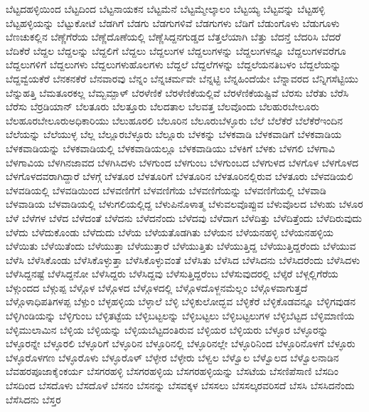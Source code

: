 {ಬೆಟ್ಟದಹಳ್ಳಿಯಿಂದ
ಬೆಟ್ಟದಿಂದ
ಬೆಟ್ಟನಾಯಕನ
ಬೆಟ್ಟಮೆನೆ
ಬೆಟ್ಟಮ್ಮೇಲ್ಕಾಲಂ
ಬೆಟ್ಟಯ್ಯ
ಬೆಟ್ಟವನ್ನು
ಬೆಟ್ಟಹಳ್ಳಿ
ಬೆಟ್ಟಹಳ್ಳಿಯನ್ನು
ಬೆಟ್ಟುಕೋಟೆ
ಬೆಡಗಿಗೆ
ಬೆಡಗು
ಬೆಡಗುಗಳಿವೆ
ಬೆಡಗುಗಳು
ಬೆಡಿಗೆ
ಬೆಡುಂಗೊಳು
ಬೆಡುಗೂಳು
ಬೆಣಚುಕಲ್ಲಿನ
ಬೆಣ್ಣೆಗೆರೆಯ
ಬೆಣ್ಣೆದೊಣೆಯಲ್ಲಿ
ಬೆಣ್ಣೆಸಿದ್ದನಗುಡ್ಡದ
ಬೆತ್ತಲೆಯಾಗಿ
ಬೆತ್ತು
ಬೆದನ್ತೆ
ಬೆದರಿಸಿ
ಬೆದರೆ
ಬೆದಿಕೆರೆ
ಬೆದ್ದಲ
ಬೆದ್ದಲನ್ನು
ಬೆದ್ದಲಿಗೆ
ಬೆದ್ದಲು
ಬೆದ್ದಲುಗಳ
ಬೆದ್ದಲುಗಳನ್ನು
ಬೆದ್ದಲುಗಳನ್ನೂ
ಬೆದ್ದಲುಗಳವರೆಗೂ
ಬೆದ್ದಲುಗಳಿಗೆ
ಬೆದ್ದಲುಗಳು
ಬೆದ್ದಲುಗಳುಹೊಲಗಳು
ಬೆದ್ದಲೆ
ಬೆದ್ದಲೆಗಳನ್ನು
ಬೆದ್ದಲೆಯನತಿಬಳಂ
ಬೆದ್ದಲೆಯನ್ನು
ಬೆದ್ದವ್ವೆಯಕೆರೆ
ಬೆನಕನಕೆರೆ
ಬೆನವಾರವು
ಬೆನ್ನಂ
ಬೆನ್ನಚರ್ಮವೇ
ಬೆನ್ನಟ್ಟಿ
ಬೆನ್ನಹಿಂದೆಯೇ
ಬೆನ್ನಾವರದ
ಬೆನ್ನಿಗಸೆಟ್ಟಿಯು
ಬೆನ್ನುಹತ್ತಿ
ಬೆಮತೂರಕಲ್ಲ
ಬೆಮ್ಬಮ್ಪಾಳ್
ಬೆರಳೆಣಿಕೆ
ಬೆರಳೆಣಿಕೆಯಲ್ಲಿವೆ
ಬೆರಳೆಣಿಕೆಯಷ್ಟಿವೆ
ಬೆರಸು
ಬೆರೆತು
ಬೆರೆಸಿ
ಬೆರೆಸು
ಬೆರ್ರಡಿಯಾನ್
ಬೆಲತೂರು
ಬೆಲತ್ತೂರು
ಬೆಲದತಾಲ
ಬೆಲವತ್ತ
ಬೆಲವೊಂದು
ಬೆಲಹುರಬೇಲೂರು
ಬೆಲಹೂರಬೇಲೂರುಅಧಿಕಾರಿಯು
ಬೆಲುಹೂರಲಿ
ಬೆಲೂರಿನ
ಬೆಲೂರುಬೆಳ್ಳೂರು
ಬೆಲೆ
ಬೆಲೆಕೆರೆ
ಬೆಲೆಕೆರೆಇಂದಿನ
ಬೆಲೆಯನ್ನು
ಬೆಲೆಯುಳ್ಳ
ಬೆಲ್ಲ
ಬೆಲ್ಲೂರಬೆಳ್ಳೂರು
ಬೆಲ್ಲೂರು
ಬೆಳಕನ್ನು
ಬೆಳಕವಾಡಿ
ಬೆಳಕವಾಡಿಗೆ
ಬೆಳಕವಾಡಿಯ
ಬೆಳಕವಾಡಿಯನ್ನು
ಬೆಳಕವಾಡಿಯಲ್ಲಿ
ಬೆಳಕವಾಡಿಯಲ್ಲೂ
ಬೆಳಕವಾಡಿಯು
ಬೆಳಕಿಗೆ
ಬೆಳಕು
ಬೆಳಗಲಿ
ಬೆಳಗಾವಿ
ಬೆಳಗಾವಿಯ
ಬೆಳಗಿನಜಾವದ
ಬೆಳಗಿಸಿದಳು
ಬೆಳಗುಂದ
ಬೆಳಗುಂಬ
ಬೆಳಗುಂಬದ
ಬೆಳಗುಳದ
ಬೆಳಗೊಳ
ಬೆಳಗೊಳದ
ಬೆಳಗೊಳದವರಾಗಿದ್ದಾರೆ
ಬೆಳಗ್ಗೆ
ಬೆಳತೂರ
ಬೆಳತೂರಿಗೆ
ಬೆಳತೂರಿನ
ಬೆಳತೂರಿನಲ್ಲಿರುವ
ಬೆಳತೂರು
ಬೆಳವಡಿಯಲಿ
ಬೆಳವಡಿಯಲ್ಲಿ
ಬೆಳವಡಿಯಿಂದ
ಬೆಳವಣಿಗೆಗೆ
ಬೆಳವಣಿಗೆಯ
ಬೆಳವಣಿಗೆಯನ್ನು
ಬೆಳವಣಿಗೆಯಲ್ಲಿ
ಬೆಳವಾಡಿ
ಬೆಳವಾಡಿಯ
ಬೆಳವಾಡಿಯಲ್ಲಿ
ಬೆಳುಗಲಿಯಲ್ಲಿದ್ದ
ಬೆಳುಪಿನೊಳಾತ್ಮ
ಬೆಳುವಲವೊಪ್ಪುವ
ಬೆಳುವೊಲದ
ಬೆಳುಹು
ಬೆಳೂರ
ಬೆಳೆ
ಬೆಳೆಗಳ
ಬೆಳೆದ
ಬೆಳೆದಂತೆ
ಬೆಳೆದನು
ಬೆಳೆದನೆಂದು
ಬೆಳೆದವು
ಬೆಳೆದಾಗ
ಬೆಳೆದಿತ್ತು
ಬೆಳೆದಿತ್ತೆಂದು
ಬೆಳೆದಿರುವುದು
ಬೆಳೆದು
ಬೆಳೆದುಕೊಂಡು
ಬೆಳೆದುದು
ಬೆಳೆಯ
ಬೆಳೆಯತೊಡಗಿತು
ಬೆಳೆಯನ
ಬೆಳೆಯನಹಳ್ಳಿ
ಬೆಳೆಯನಹಳ್ಳಿಯ
ಬೆಳೆಯಿತು
ಬೆಳೆಯಿತೆಂದು
ಬೆಳೆಯುತ್ತಾ
ಬೆಳೆಯುತ್ತಾರೆ
ಬೆಳೆಯುತ್ತಿತು
ಬೆಳೆಯುತ್ತಿದ್ದ
ಬೆಳೆಯುತ್ತಿದ್ದರೆಂದು
ಬೆಳೆಯುವ
ಬೆಳೆಸಿ
ಬೆಳೆಸಿಕೊಂಡು
ಬೆಳೆಸಿಕೊಳ್ಳುತ್ತಾ
ಬೆಳೆಸಿಕೊಳ್ಳುವಂತೆ
ಬೆಳೆಸಿತು
ಬೆಳೆಸಿದ
ಬೆಳೆಸಿದನು
ಬೆಳೆಸಿದರೆಂದು
ಬೆಳೆಸಿದಳು
ಬೆಳೆಸಿದ್ದನಷ್ಟೆ
ಬೆಳೆಸಿದ್ದನೋ
ಬೆಳೆಸಿದ್ದರು
ಬೆಳೆಸಿದ್ದವು
ಬೆಳೆಸುತ್ತಿದ್ದರೆಂಬ
ಬೆಳೆಸುವುದರಲ್ಲಿ
ಬೆಳ್ಕೆರೆ
ಬೆಳ್ಗಲ್ಲಿಗೆರೆಯ
ಬೆಳ್ಗುಂದದ
ಬೆಳ್ಗುಪ್ಪ
ಬೆಳ್ಗೊಳ
ಬೆಳ್ಗೊಳದ
ಬೆಳ್ಗೊಳದಲ್ಲಿ
ಬೆಳ್ಗೊಳದೊಳ್ಜನಮೆಲ್ಲಂ
ಬೆಳ್ಗೊಳವಾಗುತ್ತದೆ
ಬೆಳ್ಗೊಳಾಧಿಪತಿಗಳಪ್ಪ
ಬೆಳ್ಪುಂ
ಬೆಳ್ಳಹಳ್ಳಿಯ
ಬೆಳ್ಳಾಲೆ
ಬೆಳ್ಳಿ
ಬೆಳ್ಳಿಕುಲೋದ್ಭವ
ಬೆಳ್ಳಿಕೆರೆ
ಬೆಳ್ಳಿಕೊಡವನ್ನೂ
ಬೆಳ್ಳಿಗವುಡನ
ಬೆಳ್ಳಿಗಿಂಡಿಯನ್ನು
ಬೆಳ್ಳಿಗುಂಬ
ಬೆಳ್ಳಿತಟ್ಟೆಯ
ಬೆಳ್ಳಿಬಟ್ಟಲನ್ನು
ಬೆಳ್ಳಿಬಟ್ಟಲು
ಬೆಳ್ಳಿಬಟ್ಟಲುಗಳ
ಬೆಳ್ಳಿಬೆಟ್ಟದ
ಬೆಳ್ಳಿಮಾಣಿಯ
ಬೆಳ್ಳಿಮುಲಾಮಿನ
ಬೆಳ್ಳಿಯ
ಬೆಳ್ಳಿಯನ್ನು
ಬೆಳ್ಳಿಯಬೆಟ್ಟದಂತಿರುವ
ಬೆಳ್ಳಿಯರ
ಬೆಳ್ಳಿಯರು
ಬೆಳ್ಳೂರ
ಬೆಳ್ಳೂರನ್ನು
ಬೆಳ್ಳೂರನ್ನೇ
ಬೆಳ್ಳೂರಲಿ
ಬೆಳ್ಳೂರಿಗೆ
ಬೆಳ್ಳೂರಿನ
ಬೆಳ್ಳೂರಿನಲ್ಲಿ
ಬೆಳ್ಳೂರಿನಲ್ಲೇ
ಬೆಳ್ಳೂರಿನಿಂದ
ಬೆಳ್ಳೂರಿನೊಳಗೆ
ಬೆಳ್ಳೂರು
ಬೆಳ್ಳೂರೊಳಗಣ
ಬೆಳ್ಳೂರೊಳು
ಬೆಳ್ಳೂರೊಳ್
ಬೆಳ್ಳೇರ
ಬೆಳ್ಳೇರು
ಬೆಳ್ವಲ
ಬೆಳ್ವೊಲ
ಬೆಳ್ವೊಲದ
ಬೆಳ್ವೊಲನಾಡಿನ
ಬೆವಹರಪೂಜಾಕೈಂಕರ್ಯ
ಬೆಸಗರಹಳ್ಳಿ
ಬೆಸಗರಹಳ್ಳಿಯ
ಬೆಸಗರಹಳ್ಳಿಯನ್ನು
ಬೆಸಟೆಯ
ಬೆಸಣಿಪೆಸಾಣಿ
ಬೆಸದಿಂ
ಬೆಸದಿಂದ
ಬೆಸದೊಳು
ಬೆಸದೊಳೆ
ಬೆಸನಂ
ಬೆಸನನ್ನು
ಬೆಸವಕ್ಕಳ
ಬೆಸಸಲು
ಬೆಸಸಲ್ಕರವರಿಸದೆ
ಬೆಸಸಿ
ಬೆಸಸಿದನೆಂದು
ಬೆಸೆಸಿದನು
ಬೆಸ್ತರ
}
